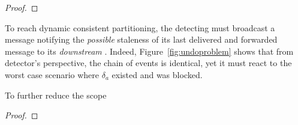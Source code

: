 \begin{proof}
\end{proof}

To reach dynamic consistent partitioning, the detecting \process must
broadcast a message notifying the \emph{possible} staleness of its
last delivered and forwarded message to its \emph{downstream}
\processes. Indeed, Figure~\ref{fig:undoproblem} shows that from
detector's perspective, the chain of events is identical, yet it must
react to the worst case scenario where $\delta_a$ existed and was
blocked.   

\begin{definition}
  To further reduce the scope  
\end{definition}

\begin{theorem}
\end{theorem}

\begin{proof}
\end{proof}


